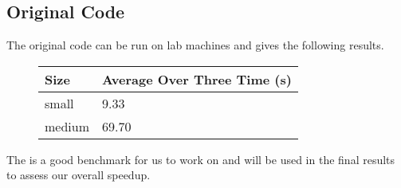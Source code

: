 \subsection{Original Code}
The original code can be run on lab machines and gives the following results.\\
\begin{figure}[H]\centering \begin{tabular}{ l | l }
  \hline
  Size & Average Over Three Time (s) \\
  \hline
  \hline
  small & 9.33 \\
  medium & 69.70 \\
  \hline
\end{tabular} \end{figure}

The is a good benchmark for us to work on and will be used in the final results to assess our overall speedup.